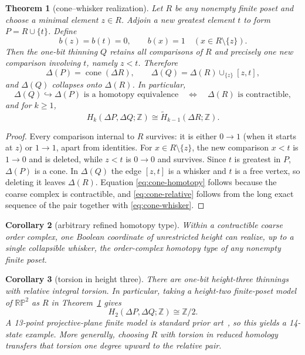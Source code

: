 \documentclass[11pt]{article}
\newtheorem{theorem}{Theorem}[section]
\newtheorem{corollary}[theorem]{Corollary}
\theoremstyle{definition}
\theoremstyle{remark}
\newcommand{\Z}{\mathbb Z}
\newcommand{\D}{\Delta}
\begin{document}
\begin{theorem}[cone--whisker realization]\label{thm:cone-whisker}
Let $R$ be any nonempty finite poset and choose a minimal element $z\in R$.  Adjoin a
new greatest element $t$ to form $P=R\cup\{t\}$.  Define
\[
  b(z)=b(t)=0,\qquad b(x)=1\quad(x\in R\setminus\{z\}).
\]
Then the one-bit thinning $Q$ retains all comparisons of $R$ and precisely one new
comparison involving $t$, namely $z<t$.  Therefore
\begin{equation}\label{eq:cone-whisker}
  \D(P)=\operatorname{cone}(\D R),
  \qquad
  \D(Q)=\D(R)\cup_{\{z\}}[z,t],
\end{equation}
and $\D(Q)$ collapses onto $\D(R)$.  In particular,
\begin{equation}\label{eq:cone-homotopy}
  \D(Q)\hookrightarrow\D(P)\text{ is a homotopy equivalence}
  \quad\Longleftrightarrow\quad
  \D(R)\text{ is contractible},
\end{equation}
and for $k\ge1$,
\begin{equation}\label{eq:cone-relative}
  H_k(\D P,\D Q;\Z)\cong\widetilde H_{k-1}(\D R;\Z).
\end{equation}
\end{theorem}

\begin{proof}
Every comparison internal to $R$ survives: it is either $0\to1$ (when it starts at
$z$) or $1\to1$, apart from identities.  For $x\in R\setminus\{z\}$, the new
comparison $x<t$ is $1\to0$ and is deleted, while $z<t$ is $0\to0$ and survives.
Since $t$ is greatest in $P$, $\D(P)$ is a cone.  In $\D(Q)$ the edge $[z,t]$ is a
whisker and $t$ is a free vertex, so deleting it leaves $\D(R)$.  Equation
\eqref{eq:cone-homotopy} follows because the coarse complex is contractible, and
\eqref{eq:cone-relative} follows from the long exact sequence of the pair together
with \eqref{eq:cone-whisker}.
\end{proof}

\begin{corollary}[arbitrary refined homotopy type]\label{cor:arbitrarytype}
Within a contractible coarse order complex, one Boolean coordinate of unrestricted
height can realize, up to a single collapsible whisker, the order-complex homotopy type
of any nonempty finite poset.
\end{corollary}

\begin{corollary}[torsion in height three]\label{cor:torsion}
There are one-bit height-three thinnings with relative integral torsion.  In
particular, taking a height-two finite-poset model of $\mathbb{RP}^2$ as $R$ in
Theorem~\ref{thm:cone-whisker} gives
\[
  H_2(\D P,\D Q;\Z)\cong\Z/2.
\]
A 13-point projective-plane finite model is standard prior art~\cite{CianciOttina2018},
so this yields a 14-state example.  More generally, choosing $R$ with torsion in
reduced homology transfers that torsion one degree upward to the relative pair.
\end{corollary}
\end{document}
